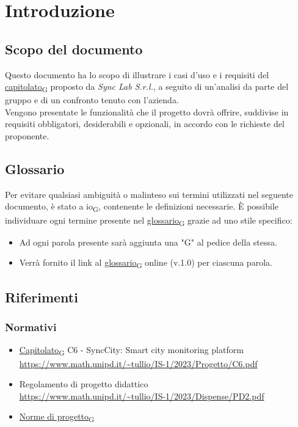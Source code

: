 \section{Introduzione}
\setcounter{subsection}{0}
\subsection{Scopo del documento}
Questo documento ha lo scopo di illustrare i casi d'uso e i requisiti del \href{https://7last.github.io/docs/rtb/documentazione-interna/glossario#capitolato}{capitolato\textsubscript{G}}
proposto da \textit{Sync Lab S.r.l.}, a seguito di un'analisi da parte del gruppo
e di un confronto tenuto con l'azienda.\\
Vengono presentate le funzionalità che il progetto dovrà offrire, suddivise in requisiti obbligatori,
desiderabili e opzionali, in accordo con le richieste del proponente.

\subsection{Glossario}
Per evitare qualsiasi ambiguità o malinteso sui termini utilizzati nel seguente documento,
è stato a io\textsubscript{G}, contenente le definizioni necessarie. È possibile individuare ogni termine presente
nel \href{https://7last.github.io/docs/rtb/documentazione-interna/glossario#glossario}{glossario\textsubscript{G}}
grazie ad uno stile specifico:
\begin{itemize}
	\item Ad ogni parola presente sarà aggiunta una "G" al pedice della stessa.
	\item Verrà fornito il link al
	      \href{https://7last.github.io/docs/rtb/documentazione-interna/glossario#glossario}{glossario\textsubscript{G}} online (v.1.0) per ciascuna parola.

\end{itemize}

\subsection{Riferimenti}
\subsubsection{Normativi}
\begin{itemize}
	\item \href{https://7last.github.io/docs/rtb/documentazione-interna/glossario#capitolato}{Capitolato\textsubscript{G}} C6 - SyncCity: Smart city monitoring platform\\
	      \url{https://www.math.unipd.it/~tullio/IS-1/2023/Progetto/C6.pdf}
	\item Regolamento di progetto didattico\\
	      \url{https://www.math.unipd.it/~tullio/IS-1/2023/Dispense/PD2.pdf}
	\item \href{https://7last.github.io/docs/rtb/documentazione-interna/glossario#norme-di-progetto}{Norme di progetto\textsubscript{G}}
\end{itemize}

